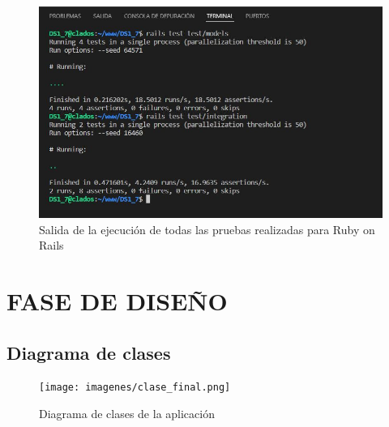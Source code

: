 \documentclass{article}
\begin{document}
\begin{figure}[H]
  \includegraphics[width=\textwidth]{imagenes/Pruebas.JPG}
  \caption{Salida de la ejecución de todas las pruebas realizadas para Ruby on Rails} 
\end{figure}

\section{FASE DE DISEÑO}
\subsection{Diagrama de clases}

\begin{figure}[H]
  \texttt{[image: imagenes/clase\_final.png]}
  \caption{Diagrama de clases de la aplicación} 
\end{figure}
\end{document}
